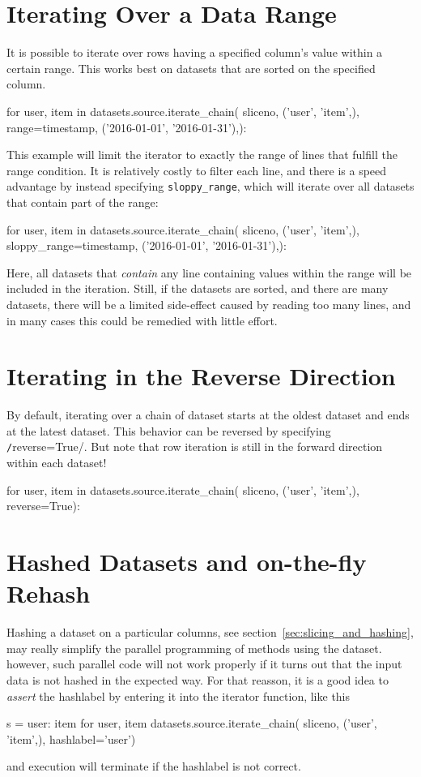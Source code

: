 \section{Iterating Over a Data Range}
\label{sec:iterate_sloppy_range}
It is possible to iterate over rows having a specified column's value
within a certain range.  This works best on datasets that are sorted
on the specified column.
\begin{python}
for user, item in datasets.source.iterate_chain(
    sliceno, ('user', 'item',),
    range={timestamp, ('2016-01-01', '2016-01-31'),}):
\end{python}
This example will limit the iterator to exactly the range of lines
that fulfill the range condition.  It is relatively costly to filter
each line, and there is a speed advantage by instead specifying
\texttt{sloppy\_range}, which will iterate over all datasets that
contain part of the range:
\begin{python}
for user, item in datasets.source.iterate_chain(
    sliceno, ('user', 'item',),
    sloppy_range={timestamp, ('2016-01-01', '2016-01-31'),}):
\end{python}
Here, all datasets that \textsl{contain} any line containing values
within the range will be included in the iteration.  Still, if the
datasets are sorted, and there are many datasets, there will be a
limited side-effect caused by reading too many lines, and in many
cases this could be remedied with little effort.



\section{Iterating in the Reverse Direction}
By default, iterating over a chain of dataset starts at the oldest
dataset and ends at the latest dataset.  This behavior can be
reversed by specifying \texttt/reverse=True/.  But note
that row iteration is still in the forward direction within each
dataset!
\begin{python}
for user, item in datasets.source.iterate_chain(
    sliceno, ('user', 'item',),
    reverse=True):
\end{python}



\section{Hashed Datasets and on-the-fly Rehash}
Hashing a dataset on a particular columns, see
section~\ref{sec:slicing_and_hashing}, may really simplify the
parallel programming of methods using the dataset.  however, such
parallel code will not work properly if it turns out that the input
data is not hashed in the expected way.  For that reasson, it is a
good idea to \emph{assert} the hashlabel by entering it into the
iterator function, like this
\begin{python}
s = {user: item for user, item datasets.source.iterate_chain(
     sliceno, ('user', 'item',), hashlabel='user')}
\end{python}
and execution will terminate if the hashlabel is not correct.

